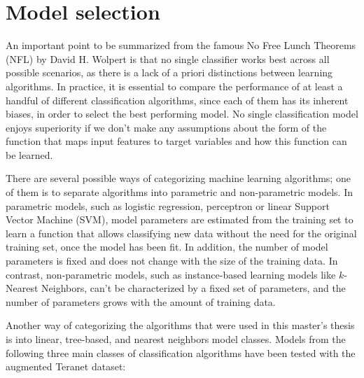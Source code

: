 \section{Model selection} \label{sec:model_selection}

An important point to be summarized from the famous No Free Lunch Theorems (NFL)\cite{Wolpert1996,Wolpert1997} by David H. Wolpert is that no single classifier works best across all possible scenarios, as there is a lack of a priori distinctions between learning algorithms.
In practice, it is essential to compare the performance of at least a handful of different classification algorithms, since each of them has its inherent biases, in order to select the best performing model.
No single classification model enjoys superiority if we don't make any assumptions about the form of the function that maps input features to target variables and how this function can be learned\cite{RaschkaMirjalili2017}.

There are several possible ways of categorizing machine learning algorithms;
one of them is to separate algorithms into parametric and non-parametric models.
In parametric models, such as logistic regression, perceptron or linear Support Vector Machine (SVM), model parameters are estimated from the training set to learn a function that allows classifying new data without the need for the original training set, once the model has been fit.
In addition, the number of model parameters is fixed and does not change with the size of the training data.
In contrast, non-parametric models, such as instance-based learning models like $k$-Nearest Neighbors, can't be characterized by a fixed set of parameters, and the number of parameters grows with the amount of training data.

Another way of categorizing the algorithms that were used in this master's thesis is into linear, tree-based, and nearest neighbors model classes.
Models from the following three main classes of classification algorithms have been tested with the augmented Teranet dataset:

